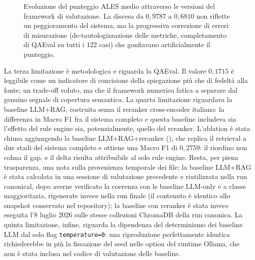 \begin{figure}[t]
  \centering
  \caption{Evoluzione del punteggio ALES medio attraverso le versioni del framework di valutazione. La discesa da $0{,}9787$ a $0{,}6810$ non riflette un peggioramento del sistema, ma la progressiva correzione di errori di misurazione (de-tautologizzazione delle metriche, completamento di QAEval su tutti i $122$ casi) che gonfiavano artificialmente il punteggio.}
  \label{fig:ales-evol}
\end{figure}

La terza limitazione è metodologica e riguarda la QAEval. Il valore $0{,}1715$ è leggibile come un indicatore di concisione della spiegazione più che di fedeltà alla fonte; un trade-off voluto, ma che il framework numerico fatica a separare dal genuino segnale di copertura semantica. La quarta limitazione riguardava la baseline LLM+RAG, costruita senza il reranker cross-encoder italiano: la differenza in Macro F1 fra il sistema completo e questa baseline includeva sia l'effetto del rule engine sia, potenzialmente, quello del reranker. L'ablation è stata chiusa aggiungendo la baseline LLM+RAG+reranker (), che replica il retrieval a due stadi del sistema completo e ottiene una Macro F1 di $0{,}2759$: il riordino non colma il gap, e il delta risulta attribuibile al solo rule engine. Resta, per piena trasparenza, una nota sulla provenienza temporale dei file: la baseline LLM+RAG è stata calcolata in una sessione di valutazione precedente e riutilizzata nella run canonical, dopo averne verificato la coerenza con le baseline LLM-only e a classe maggioritaria, rigenerate invece nella run finale (il contenuto è identico allo snapshot conservato nel repository); la baseline con reranker è stata invece eseguita l'8 luglio 2026 sulle stesse collezioni ChromaDB della run canonica. La quinta limitazione, infine, riguarda la dipendenza del determinismo dei baseline LLM dal solo flag \texttt{temperature=0}: una riproduzione perfettamente identica richiederebbe in più la fissazione del seed nelle option del runtime Ollama, che non è stata inclusa nel codice di valutazione delle baseline.

